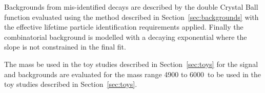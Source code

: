 Backgrounds from mis-identified \bhh decays are described by the double Crystal Ball function evaluated using the method described in Section~\ref{sec:backgrounds} with the effective lifetime particle identification requirements applied. Finally the combinatorial background is modelled with a decaying exponential where the slope is not constrained in the final fit.

The mass \pdfs be used in the toy studies described in Section~\ref{sec:toys} for the signal and backgrounds are evaluated for the mass range 4900 to 6000~\mevcc to be used in the toy studies described in Section~\ref{sec:toys}. %


